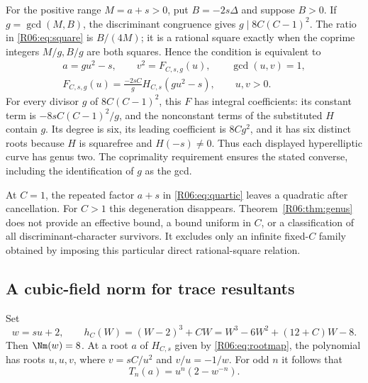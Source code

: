 \documentclass[11pt,a4paper]{article}
\theoremstyle{definition}\newtheorem{definition}[theorem]{Definition}
\theoremstyle{remark}\newtheorem{remark}[theorem]{Remark}
\begin{document}
For the positive range $M=a+s>0$, put $B=-2s\Delta$ and suppose
$B>0$. If $g=\gcd(M,B)$, the discriminant congruence gives
$g\mid8C(C-1)^2$. The ratio in \eqref{R06:eq:square} is $B/(4M)$;
it is a rational square exactly when the coprime integers $M/g,B/g$
are both squares. Hence the condition is equivalent to
\begin{equation}\label{R06:eq:genus2}
 \begin{gathered}
 a=gu^2-s,\qquad v^2=F_{C,s,g}(u),\qquad\gcd(u,v)=1,\\
 F_{C,s,g}(u)=\frac{-2sC}{g}H_{C,s}(gu^2-s),\qquad u,v>0.
 \end{gathered}
\end{equation}
For every divisor $g$ of $8C(C-1)^2$, this $F$ has integral
coefficients: its constant term is $-8sC(C-1)^2/g$, and the
nonconstant terms of the substituted $H$ contain $g$.
Its degree is six, its leading coefficient is $8Cg^2$, and it has
six distinct roots because $H$ is squarefree and $H(-s)\ne0$.
Thus each displayed hyperelliptic curve has genus two.
The coprimality requirement ensures the stated converse, including
the identification of $g$ as the gcd.

At $C=1$, the repeated factor $a+s$ in \eqref{R06:eq:quartic} leaves a
quadratic after cancellation. For $C>1$ this degeneration disappears.
Theorem~\ref{R06:thm:genus} does not provide an effective bound, a bound
uniform in $C$, or a classification of all discriminant-character
survivors. It excludes only an infinite fixed-$C$ family obtained
by imposing this particular direct rational-square relation.

\subsection{A cubic-field norm for trace resultants}
\label{R06:sec:norm}

Set
\begin{equation}\label{R06:eq:h}
 w=su+2,\qquad h_C(W)=(W-2)^3+CW
 =W^3-6W^2+(12+C)W-8.
\end{equation}
Then $\Nm(w)=8$. At a root $a$ of $H_{C,s}$ given by
\eqref{R06:eq:rootmap}, the polynomial has roots $u,u,v$, where
$v=sC/u^2$ and $v/u=-1/w$.
For odd $n$ it follows that
\begin{equation}\label{R06:eq:ramtrace}
 T_n(a)=u^n(2-w^{-n}).
\end{equation}
\end{document}
